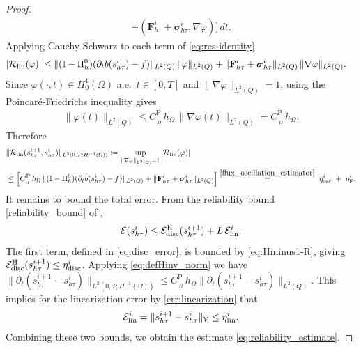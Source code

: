 \documentclass[review,11pt]{article}
\numberwithin{equation}{section}
\def \f  {\varphi}
\def \Om {\Omega}
\def \p  {\partial}
\begin{document}
\begin{proof}
\begin{align}
+ (\mathbf{F}^i_{h\tau} + \boldsymbol{\sigma}^i_{h\tau},\nabla\varphi)\Big]\,dt.
\end{align}
Applying Cauchy-Schwarz to each term of \eqref{eq:res-identity},
\begin{align*}
\left| \mathcal{R}_{\rm lin}(\varphi)\right|
&\leq \|(\mathbb{I}-\Pi^0_h)(\partial_t b(s^i_{h\tau})-f)\|_{L^2(Q)}\,
\|\varphi\|_{L^2(Q)}+\|\mathbf{F}^i_{h\tau}+\boldsymbol{\sigma}^i_{h\tau}\|_{L^2(Q)}\,
\|\nabla\varphi\|_{L^2(Q)}.
\end{align*}
Since $\varphi(\cdot,t)\in H^1_0(\Omega)$ a.e.\ $t\in [0,T]$ and $\|\nabla \f\|_{L^2(Q)}=1$, using the Poincar\'e-Friedrichs inequality gives 
\begin{align}
    \|\varphi(t)\|_{L^2(Q)}\leq C_{\,\!_{\Omega}}^{\mathrm{P}}\,h_\Omega\, \|\nabla\varphi(t)\|_{L^2(Q)}=C_{\,\!_{\Omega}}^{\mathrm{P}}\, h_\Omega.
\end{align}
Therefore
\begin{align}\label{eq:Hminus1-R}
&\|\mathcal{R}_{\rm lin}(s^{i+1}_{h\tau},s^i_{h\tau})\|_{L^2(0,T;H^{-1}(\Omega))} :=\sup_{\|\nabla \f\|_{L^2(Q)}=1}\left| \mathcal{R}_{\rm lin}(\varphi)\right|\nonumber
\\
&\leq \Big[C_{\,\!_{\Omega}}^{\mathrm{P}}\,h_\Omega\,
\|(\mathbb{I}-\Pi^0_h)(\partial_t b(s^i_{h\tau})-f)\|_{L^2(Q)}
+ \|\mathbf{F}^i_{h\tau}+\boldsymbol{\sigma}^i_{h\tau}\|_{L^2(Q)}\Big]\overset{\eqref{flux_oscillation_estimator}}{=}\;
\eta^i_{\rm osc} \;+\; \eta^i_{\rm F}.
\end{align}
It remains to bound the total error. From the reliability bound 
\eqref{reliability_bound} of ,
\[
\mathcal{E}(s^i_{h\tau}) 
\leq \mathcal{E}^{\rm H}_{\rm disc}(s^{i+1}_{h\tau}) + L\,\mathcal{E}^i_{\rm lin}.
\]
The first term, defined in \eqref{eq:disc_error}, is bounded by \eqref{eq:Hminus1-R}, giving $\mathcal{E}^{\rm H}_{\rm disc}(s^{i+1}_{h\tau})\leq \eta^i_{\rm disc}$.
Applying \eqref{eq:defHinv_norm} we have $\|\p_t(s^{i+1}_{h\tau}-s^i_{h\tau})\|_{L^2(0,T;H^{-1}(\Om))}\leq C_{\,\!_{\Omega}}^{\mathrm{P}}\, h_\Om\|\p_t(s^{i+1}_{h\tau}-s^i_{h\tau})\|_{L^2(Q)}$. This implies for the linearization error by \eqref{err:linearization} that
\[\mathcal{E}^i_{\rm lin} = \|s^{i+1}_{h\tau}-s^i_{h\tau}\|_{\mathcal{V}} \leq  \eta^i_{\rm lin}.\]
Combining these two bounds, we obtain the estimate \eqref{eq:reliability_estimate}.
\end{proof}
\end{document}
